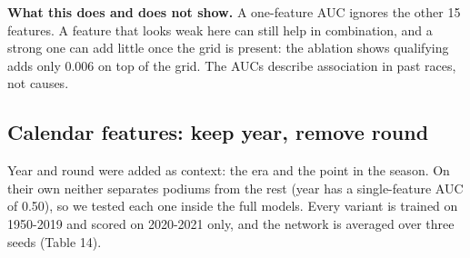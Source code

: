 \documentclass[10pt,a4paper]{article}
\begin{document}
\begin{takeaway}
\textbf{What this does and does not show.} A one-feature AUC ignores the other 15 features. A feature that looks weak here can still help in combination, and a strong one can add little once the grid is present: the ablation shows qualifying adds only 0.006 on top of the grid. The AUCs describe association in past races, not causes.
\end{takeaway}



\subsection{Calendar features: keep year, remove round}


Year and round were added as context: the era and the point in the season. On their own neither separates podiums from the rest (year has a single-feature AUC of 0.50), so we tested each one inside the full models. Every variant is trained on 1950-2019 and scored on 2020-2021 only, and the network is averaged over three seeds (Table 14).
\end{document}
